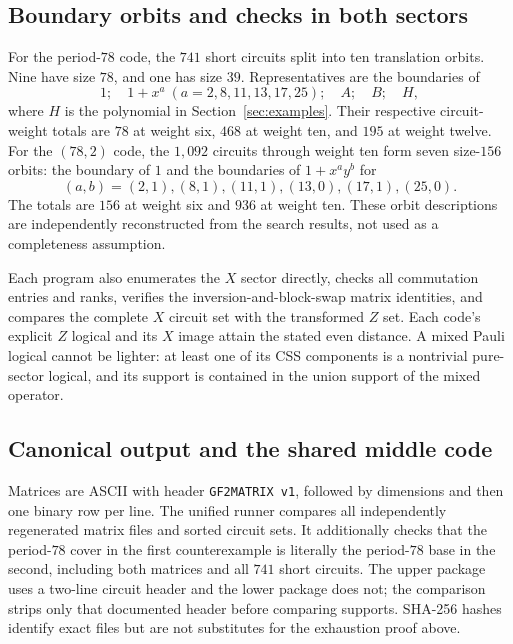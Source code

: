 \subsection{Boundary orbits and checks in both sectors}
For the period-$78$ code, the $741$ short circuits split into ten translation orbits. Nine have size $78$, and one has size $39$. Representatives are the boundaries of
\[
 1;\quad 1+x^a\ (a=2,8,11,13,17,25);\quad A;\quad B;\quad H,
\]
where $H$ is the polynomial in Section~\ref{sec:examples}. Their respective circuit-weight totals are $78$ at weight six, $468$ at weight ten, and $195$ at weight twelve. For the $(78,2)$ code, the $1,092$ circuits through weight ten form seven size-$156$ orbits: the boundary of $1$ and the boundaries of $1+x^ay^b$ for
\[
 (a,b)=(2,1),(8,1),(11,1),(13,0),(17,1),(25,0).
\]
The totals are $156$ at weight six and $936$ at weight ten. These orbit descriptions are independently reconstructed from the search results, not used as a completeness assumption.

Each program also enumerates the $X$ sector directly, checks all commutation entries and ranks, verifies the inversion-and-block-swap matrix identities, and compares the complete $X$ circuit set with the transformed $Z$ set. Each code's explicit $Z$ logical and its $X$ image attain the stated even distance. A mixed Pauli logical cannot be lighter: at least one of its CSS components is a nontrivial pure-sector logical, and its support is contained in the union support of the mixed operator.

\subsection{Canonical output and the shared middle code}
Matrices are ASCII with header \texttt{GF2MATRIX v1}, followed by dimensions and then one binary row per line. The unified runner compares all independently regenerated matrix files and sorted circuit sets. It additionally checks that the period-$78$ cover in the first counterexample is literally the period-$78$ base in the second, including both matrices and all $741$ short circuits. The upper package uses a two-line circuit header and the lower package does not; the comparison strips only that documented header before comparing supports. SHA-256 hashes identify exact files but are not substitutes for the exhaustion proof above.
